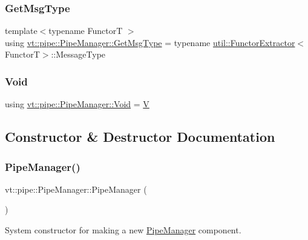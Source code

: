 \subsubsection{\texorpdfstring{Get\+Msg\+Type}{GetMsgType}}
{\footnotesize\ttfamily template$<$typename FunctorT $>$ \\
using \hyperlink{structvt_1_1pipe_1_1_pipe_manager_a221ce8bc0fc6639f43dad1e53a08c0d2}{vt\+::pipe\+::\+Pipe\+Manager\+::\+Get\+Msg\+Type} =  typename \hyperlink{structvt_1_1util_1_1_functor_extractor}{util\+::\+Functor\+Extractor}$<$FunctorT$>$\+::Message\+Type}

\mbox{\label{structvt_1_1pipe_1_1_pipe_manager_ab720c2580ecfd3ab36e49aeaaff64cc6}} 
\subsubsection{\texorpdfstring{Void}{Void}}
{\footnotesize\ttfamily using \hyperlink{structvt_1_1pipe_1_1_pipe_manager_ab720c2580ecfd3ab36e49aeaaff64cc6}{vt\+::pipe\+::\+Pipe\+Manager\+::\+Void} =  \hyperlink{structvt_1_1pipe_1_1_pipe_manager_t_l_a8d394521df58abfd90c1d81c998f22e3}{V}}



\subsection{Constructor \& Destructor Documentation}
\mbox{\label{structvt_1_1pipe_1_1_pipe_manager_aa2cf0e54dc146056c077aba1aa2ae42b}} 
\subsubsection{\texorpdfstring{Pipe\+Manager()}{PipeManager()}}
{\footnotesize\ttfamily vt\+::pipe\+::\+Pipe\+Manager\+::\+Pipe\+Manager (\begin{DoxyParamCaption}{ }\end{DoxyParamCaption})}



System constructor for making a new \hyperlink{structvt_1_1pipe_1_1_pipe_manager}{Pipe\+Manager} component. 



